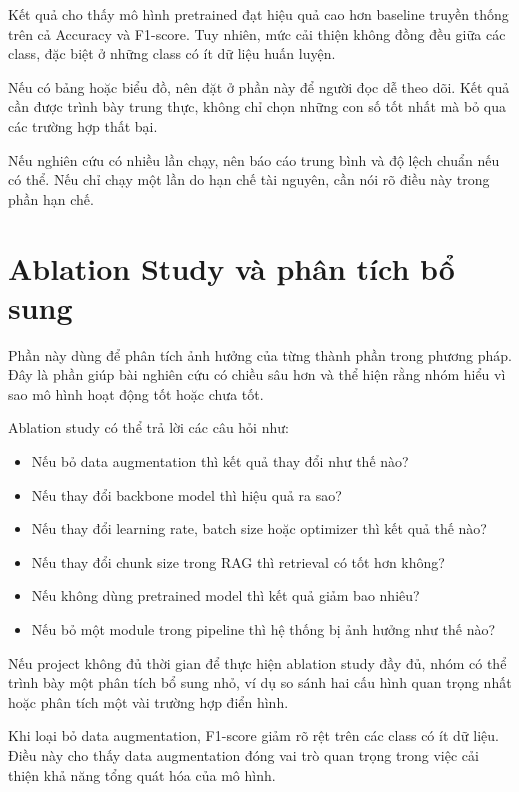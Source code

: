 \documentclass[12pt]{ai_conquer2026}
\begin{document}
\begin{aivncodebox}[Ví dụ:]
Kết quả cho thấy mô hình pretrained đạt hiệu quả cao hơn baseline truyền thống trên cả Accuracy và F1-score. Tuy nhiên, mức cải thiện không đồng đều giữa các class, đặc biệt ở những class có ít dữ liệu huấn luyện.
\end{aivncodebox}

Nếu có bảng hoặc biểu đồ, nên đặt ở phần này để người đọc dễ theo dõi. Kết quả cần được trình bày trung thực, không chỉ chọn những con số tốt nhất mà bỏ qua các trường hợp thất bại.

Nếu nghiên cứu có nhiều lần chạy, nên báo cáo trung bình và độ lệch chuẩn nếu có thể. Nếu chỉ chạy một lần do hạn chế tài nguyên, cần nói rõ điều này trong phần hạn chế.

\section{Ablation Study và phân tích bổ sung}

Phần này dùng để phân tích ảnh hưởng của từng thành phần trong phương pháp. Đây là phần giúp bài nghiên cứu có chiều sâu hơn và thể hiện rằng nhóm hiểu vì sao mô hình hoạt động tốt hoặc chưa tốt.

Ablation study có thể trả lời các câu hỏi như:

\begin{itemize}
\item Nếu bỏ data augmentation thì kết quả thay đổi như thế nào?
\item Nếu thay đổi backbone model thì hiệu quả ra sao?
\item Nếu thay đổi learning rate, batch size hoặc optimizer thì kết quả thế nào?
\item Nếu thay đổi chunk size trong RAG thì retrieval có tốt hơn không?
\item Nếu không dùng pretrained model thì kết quả giảm bao nhiêu?
\item Nếu bỏ một module trong pipeline thì hệ thống bị ảnh hưởng như thế nào?
\end{itemize}

Nếu project không đủ thời gian để thực hiện ablation study đầy đủ, nhóm có thể trình bày một phân tích bổ sung nhỏ, ví dụ so sánh hai cấu hình quan trọng nhất hoặc phân tích một vài trường hợp điển hình.


\begin{aivncodebox}[Ví dụ:]
Khi loại bỏ data augmentation, F1-score giảm rõ rệt trên các class có ít dữ liệu. Điều này cho thấy data augmentation đóng vai trò quan trọng trong việc cải thiện khả năng tổng quát hóa của mô hình.
\end{aivncodebox}
\end{document}
